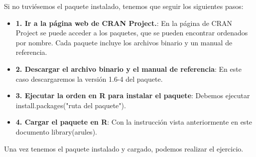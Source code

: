 \documentclass [a4paper] {article}
\begin{document}
Si no tuviésemos el paquete instalado, tenemos que seguir los siguientes pasos:
\begin{itemize}
	\item \textbf{1. Ir a la página web de CRAN Project.}: En la página de CRAN Project se puede acceder a los paquetes, que se pueden encontrar 
                                                                																					ordenados por nombre. Cada paquete incluye los archivos binario y un manual de referencia.
	\item \textbf{2. Descargar el archivo binario y el manual de referencia}: En este caso descargaremos la versión 1.6-4 del paquete.
	\item \textbf{3. Ejecutar la orden en R para instalar el paquete}: Debemos ejecutar install.packages("ruta del paquete").
    \item \textbf{4. Cargar el paquete en R}: Con la instrucción vista anteriormente en este documento library(arules).									 
\end{itemize}

Una vez tenemos el paquete instalado y cargado, podemos realizar el ejercicio.
\end{document}
